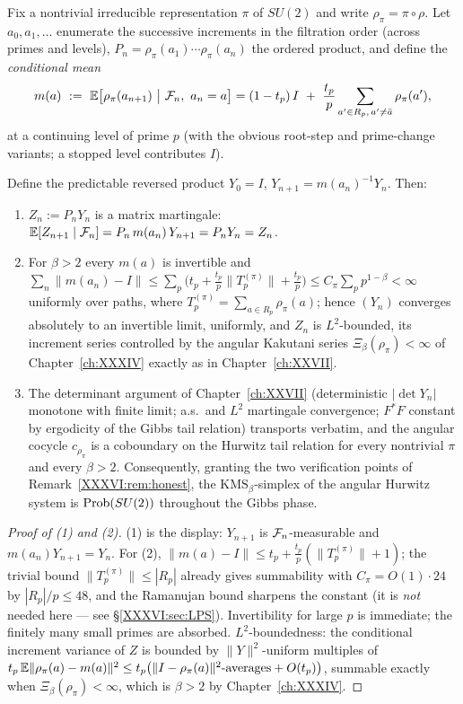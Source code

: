 Fix a nontrivial irreducible representation $\pi$ of $SU(2)$ and write $\rho_\pi=
\pi\circ\rho$. Let $a_0,a_1,\dots$ enumerate the successive increments in the filtration
order (across primes and levels), $P_n=\rho_\pi(a_1)\cdots\rho_\pi(a_n)$ the ordered
product, and define the \emph{conditional mean}
\[
m(a)\ :=\ \E\bigl[\rho_\pi(a_{n+1})\ \big|\ \F_n,\ a_n=a\bigr]
=(1-t_p)\,I\ +\ \frac{t_p}{p}\sum_{a'\in R_p,\,a'\ne\bar a}\rho_\pi(a'),
\]
at a continuing level of prime $p$ (with the obvious root-step and prime-change
variants; a stopped level contributes $I$).

\begin{theorem}\label{XXXVI:thm:transport}
Define the predictable reversed product $Y_0=I$, $Y_{n+1}=m(a_n)^{-1}Y_n$. Then:
\begin{enumerate}
\item $Z_n:=P_nY_n$ is a matrix martingale:
$\mathbb{E}[Z_{n+1}\mid\mathcal{F}_n]=P_n\,m(a_n)\,Y_{n+1}=P_nY_n=Z_n$.
\item For $\beta>2$ every $m(a)$ is invertible and
$\sum_n\|m(a_n)-I\|\le\sum_p\bigl(t_p+\tfrac{t_p}{p}\|T_p^{(\pi)}\|+\tfrac{t_p}{p}\bigr)
\le C_\pi\sum_p p^{1-\beta}<\infty$
uniformly over paths, where $T_p^{(\pi)}=\sum_{a\in R_p}\rho_\pi(a)$; hence
$(Y_n)$ converges absolutely to an invertible limit, uniformly, and $Z_n$ is
$L^2$-bounded, its increment series controlled by the angular Kakutani series
$\Xi_\beta(\rho_\pi)<\infty$ of Chapter~\ref{ch:XXXIV} exactly as in Chapter~\ref{ch:XXVII}.
\item The determinant argument of Chapter~\ref{ch:XXVII} (deterministic $|\det Y_n|$ monotone with
finite limit; a.s.\ and $L^2$ martingale convergence; $F^*F$ constant by ergodicity of
the Gibbs tail relation) transports verbatim, and the angular cocycle $c_{\rho_\pi}$ is
a coboundary on the Hurwitz tail relation for every nontrivial $\pi$ and every
$\beta>2$. Consequently, granting the two verification points of
Remark~\ref{XXXVI:rem:honest}, the $\mathrm{KMS}_\beta$-simplex of the angular Hurwitz system
is $\mathrm{Prob}(SU(2))$ throughout the Gibbs phase.
\end{enumerate}
\end{theorem}

\begin{proof}[Proof of (1) and (2)]
(1) is the display: $Y_{n+1}$ is $\mathcal{F}_n$-measurable and $m(a_n)Y_{n+1}=Y_n$. For (2),
$\|m(a)-I\|\le t_p+\frac{t_p}{p}(\|T_p^{(\pi)}\|+1)$; the trivial bound
$\|T_p^{(\pi)}\|\le|R_p|$ already gives summability with $C_\pi=O(1)\cdot24$ by
$|R_p|/p\le48$, and the Ramanujan bound sharpens the constant (it is \emph{not} needed
here --- see \S\ref{XXXVI:sec:LPS}). Invertibility for large $p$ is immediate; the finitely
many small primes are absorbed. $L^2$-boundedness: the conditional increment variance of
$Z$ is bounded by $\|Y\|^2$-uniform multiples of
$t_p\,\mathbb{E}\|\rho_\pi(a)-m(a)\|^2\le t_p\bigl(\|I-\rho_\pi(a)\|^2\text{-averages}+O(t_p)\bigr)$,
summable exactly when $\Xi_\beta(\rho_\pi)<\infty$, which is $\beta>2$ by Chapter~\ref{ch:XXXIV}.
\end{proof}

